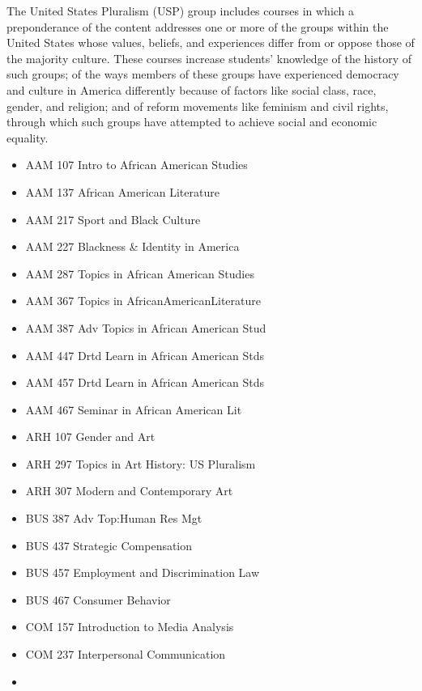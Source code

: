 \documentclass[
  letterpaper,
]{scrbook}
\providecommand{\tightlist}{%
  \setlength{\itemsep}{0pt}\setlength{\parskip}{0pt}}
\begin{document}
The United States Pluralism (USP) group includes courses in which a
preponderance of the content addresses one or more of the groups within
the United States whose values, beliefs, and experiences differ from or
oppose those of the majority culture. These courses increase students'
knowledge of the history of such groups; of the ways members of these
groups have experienced democracy and culture in America differently
because of factors like social class, race, gender, and religion; and of
reform movements like feminism and civil rights, through which such
groups have attempted to achieve social and economic equality.

\begin{itemize}
\tightlist
\item
  AAM 107 Intro to African American Studies
\item
  AAM 137 African American Literature\\
\item
  AAM 217 Sport and Black Culture\\
\item
  AAM 227 Blackness \& Identity in America
\item
  AAM 287 Topics in African American Studies
\item
  AAM 367 Topics in AfricanAmericanLiterature
\item
  AAM 387 Adv Topics in African American Stud
\item
  AAM 447 Drtd Learn in African American Stds
\item
  AAM 457 Drtd Learn in African American Stds
\item
  AAM 467 Seminar in African American Lit
\item
  ARH 107 Gender and Art\\
\item
  ARH 297 Topics in Art History: US Pluralism\\
\item
  ARH 307 Modern and Contemporary Art
\item
  BUS 387 Adv Top:Human Res Mgt
\item
  BUS 437 Strategic Compensation\\
\item
  BUS 457 Employment and Discrimination Law
\item
  BUS 467 Consumer Behavior
\item
  COM 157 Introduction to Media Analysis
\item
  COM 237 Interpersonal Communication
\item

\end{itemize}
\end{document}
